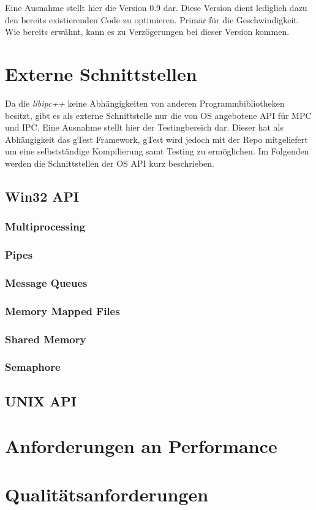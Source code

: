 \documentclass[a4paper]{book}
\begin{document}
\noindent Eine Ausnahme stellt hier die Version 0.9 dar. Diese Version dient lediglich dazu den bereits existierenden Code zu optimieren. Primär für die Geschwindigkeit. Wie bereits erwähnt, kann es zu Verzögerungen bei dieser Version kommen.

\section{Externe Schnittstellen}
Da die \textit{libipc++} keine Abhängigkeiten von anderen Programmbibliotheken besitzt, gibt es als externe Schnittstelle nur die von OS angebotene API für MPC und IPC. Eine Ausnahme stellt hier der Testingbereich dar. Dieser hat als Abhängigkeit das gTest Framework, gTest wird jedoch mit der Repo mitgeliefert um eine selbstständige Kompilierung samt Testing zu ermöglichen. Im Folgenden werden die Schnittstellen der OS API kurz beschrieben.

\subsection{Win32 API}
\blindtext

\subsubsection{Multiprocessing}
\blindtext

\subsubsection{Pipes}
\blindtext

\subsubsection{Message Queues}
\blindtext

\subsubsection{Memory Mapped Files}
\blindtext

\subsubsection{Shared Memory}
\blindtext

\subsubsection{Semaphore}
\blindtext

\subsection{UNIX API}
\blindtext

\section{Anforderungen an Performance}
\blindtext

\section{Qualitätsanforderungen}
\blindtext
\end{document}
